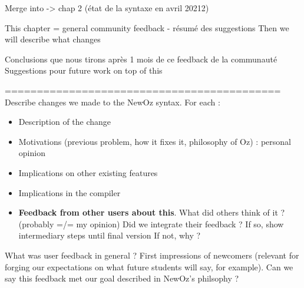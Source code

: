 
Merge into -> chap 2 (état de la syntaxe en avril 20212)

This chapter = general community feedback - résumé des suggestions
Then we will describe what changes

Conclusions que nous tirons après 1 mois de ce feedback de la communauté
Suggestions pour future work on top of this

===========================================
Describe changes we made to the NewOz syntax.
For each :
\begin{itemize}
    \item Description of the change
    \item Motivations (previous problem, how it fixes it, philosophy of Oz) : personal opinion
    \item Implications on other existing features
    \item Implications in the compiler
    \item \textbf{Feedback from other users about this}.
    What did others think of it ? (probably =/= my opinion)
    Did we integrate their feedback ?
    If so, show intermediary steps until final version
    If not, why ?
\end{itemize}

What was user feedback in general ?
First impressions of newcomers (relevant for forging our expectations on what future students will say, for example).
Can we say this feedback met our goal described in NewOz's philsophy ?